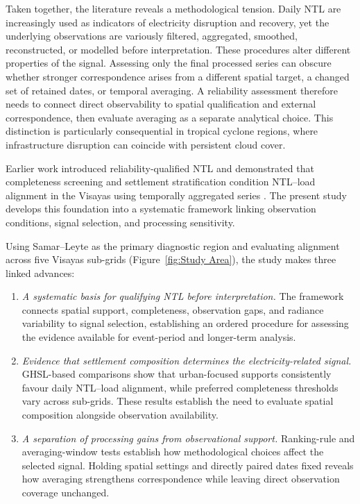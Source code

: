 \documentclass[]{interact}
\theoremstyle{plain}%
\theoremstyle{definition}
\theoremstyle{remark}
\begin{document}
    Taken together, the literature reveals a methodological tension. Daily NTL are increasingly used as indicators of electricity disruption and recovery, yet the underlying observations are variously filtered, aggregated, smoothed, reconstructed, or modelled before interpretation. These procedures alter different properties of the signal. Assessing only the final processed series can obscure whether stronger correspondence arises from a different spatial target, a changed set of retained dates, or temporal averaging. A reliability assessment therefore needs to connect direct observability to spatial qualification and external correspondence, then evaluate averaging as a separate analytical choice. This distinction is particularly consequential in tropical cyclone regions, where infrastructure disruption can coincide with persistent cloud cover.
    
    Earlier work introduced reliability-qualified NTL and demonstrated that completeness screening and settlement stratification condition NTL--load alignment in the Visayas using temporally aggregated series \citep{Principe2026_ISPRS}. The present study develops this foundation into a systematic framework linking observation conditions, signal selection, and processing sensitivity.

    Using Samar--Leyte as the primary diagnostic region and evaluating alignment across five Visayas sub-grids (Figure~\ref{fig:Study Area}), the study makes three linked advances:
    
    \begin{enumerate}
        \item \textit{A systematic basis for qualifying NTL before interpretation.} The framework connects spatial support, completeness, observation gaps, and radiance variability to signal selection, establishing an ordered procedure for assessing the evidence available for event-period and longer-term analysis.
    
        \item \textit{Evidence that settlement composition determines the electricity-related signal.} GHSL-based comparisons show that urban-focused supports consistently favour daily NTL--load alignment, while preferred completeness thresholds vary across sub-grids. These results establish the need to evaluate spatial composition alongside observation availability.
    
        \item \textit{A separation of processing gains from observational support.} Ranking-rule and averaging-window tests establish how methodological choices affect the selected signal. Holding spatial settings and directly paired dates fixed reveals how averaging strengthens correspondence while leaving direct observation coverage unchanged.
    \end{enumerate}
\end{document}
